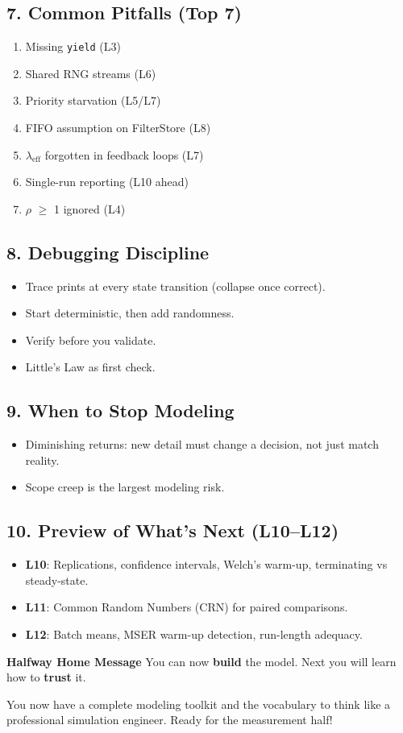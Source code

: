 \documentclass[11pt]{article}
\begin{document}
\subsection*{7. Common Pitfalls (Top 7)}
\begin{enumerate}[leftmargin=*]
\item Missing \texttt{yield} (L3)  
\item Shared RNG streams (L6)  
\item Priority starvation (L5/L7)  
\item FIFO assumption on FilterStore (L8)  
\item $\lambda_{\text{eff}}$ forgotten in feedback loops (L7)  
\item Single-run reporting (L10 ahead)  
\item $\rho$ $\geq$ 1 ignored (L4)
\end{enumerate}

\subsection*{8. Debugging Discipline}
\begin{itemize}[leftmargin=*]
\item Trace prints at every state transition (collapse once correct).  
\item Start deterministic, then add randomness.  
\item Verify before you validate.  
\item Little's Law as first check.
\end{itemize}

\subsection*{9. When to Stop Modeling}
\begin{itemize}[leftmargin=*]
\item Diminishing returns: new detail must change a decision, not just match reality.  
\item Scope creep is the largest modeling risk.
\end{itemize}

\subsection*{10. Preview of What's Next (L10--L12)}
\begin{itemize}[leftmargin=*]
\item \textbf{L10}: Replications, confidence intervals, Welch's warm-up, terminating vs steady-state.  
\item \textbf{L11}: Common Random Numbers (CRN) for paired comparisons.  
\item \textbf{L12}: Batch means, MSER warm-up detection, run-length adequacy.
\end{itemize}

\textbf{Halfway Home Message}
You can now \textbf{build} the model.  
Next you will learn how to \textbf{trust} it.

You now have a complete modeling toolkit and the vocabulary to think like a professional simulation engineer. Ready for the measurement half!
\end{document}
